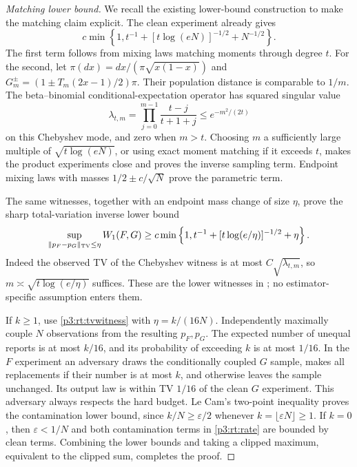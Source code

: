 \documentclass[11pt,a4paper]{article}
\theoremstyle{definition}
\theoremstyle{remark}
\numberwithin{equation}{section}
\begin{document}
\begin{proof}[Matching lower bound]
We recall the existing lower-bound construction to make the matching
claim explicit.  The clean experiment already gives
\[
 c\min\left\{1,t^{-1}+[t\log(eN)]^{-1/2}+N^{-1/2}\right\}.
\]
The first term follows from mixing laws matching moments through
degree $t$.  For the second, let
$\pi(dx)=dx/(\pi\sqrt{x(1-x)})$ and
$G_m^\pm=(1\pm T_m(2x-1)/2)\pi$.
Their population distance is comparable to $1/m$.  The beta--binomial
conditional-expectation operator has squared singular value
\[
 \lambda_{t,m}=\prod_{j=0}^{m-1}\frac{t-j}{t+1+j}
                         \le e^{-m^2/(2t)}
\]
on this Chebyshev mode, and zero when $m>t$.
Choosing $m$ a sufficiently large multiple of
$\sqrt{t\log(eN)}$, or using exact moment matching if it exceeds
$t$, makes the product experiments close and proves the inverse
sampling term.  Endpoint mixing laws with masses
$1/2\pm c/\sqrt N$ prove the parametric term.

The same witnesses, together with an endpoint mass change of size
$\eta$, prove the sharp total-variation inverse lower bound
\begin{equation}\label{p3:rt:tvwitness}
 \sup_{\|p_F-p_G\|_{\rm TV}\le\eta}W_1(F,G)
 \ge c\min\left\{1,t^{-1}+[t\log(e/\eta)]^{-1/2}+\eta\right\}.
\end{equation}
Indeed the observed TV of the Chebyshev witness is at most
$C\sqrt{\lambda_{t,m}}$, so $m\asymp\sqrt{t\log(e/\eta)}$
suffices.  These are the lower witnesses in
\cite[Parts VII--VIII]{p3:RT_Compiled2026}; no estimator-specific
assumption enters them.

If $k\ge1$, use \eqref{p3:rt:tvwitness} with $\eta=k/(16N)$.
Independently maximally couple $N$ observations from the resulting
$p_F,p_G$.  The expected number of unequal reports is at most $k/16$,
and its probability of exceeding $k$ is at most $1/16$.
In the $F$ experiment an adversary draws the conditionally coupled
$G$ sample, makes all replacements if their number is at most $k$,
and otherwise leaves the sample unchanged.  Its output law is within
TV $1/16$ of the clean $G$ experiment.  This adversary always respects
the hard budget.  Le Cam's two-point inequality proves the
contamination lower bound, since $k/N\ge\varepsilon/2$ whenever
$k=\lfloor\varepsilon N\rfloor\ge1$.
If $k=0$, then $\varepsilon<1/N$ and both contamination terms in
\eqref{p3:rt:rate} are bounded by clean terms.  Combining the lower
bounds and taking a clipped maximum, equivalent to the clipped sum,
completes the proof.
\end{proof}
\end{document}
